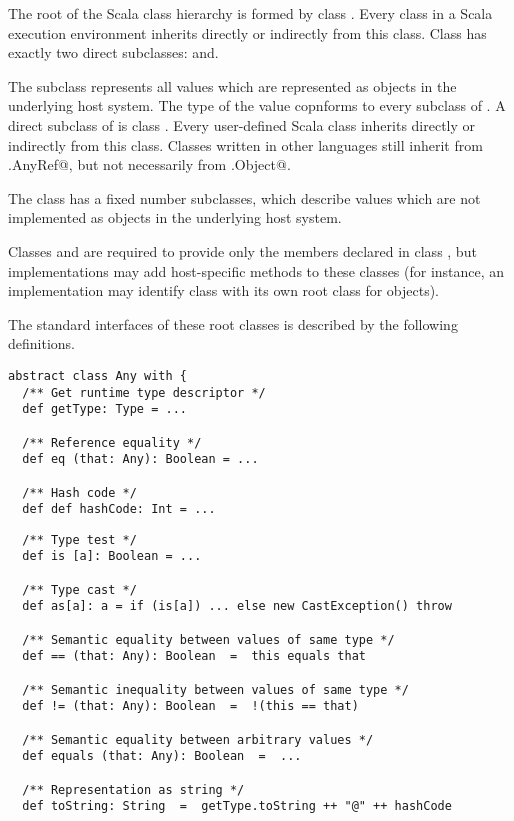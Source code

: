 \documentclass[11pt]{report}
\begin{document}
\begin{itemize}
The root of the Scala class hierarchy is formed by class \verb@Any@.
Every class in a Scala execution environment inherits directly or
indirectly from this class.  Class \verb@Any@ has exactly two direct
subclasses: \verb@AnyRef@ and\verb@AnyVal@.

The subclass \verb@AnyRef@ represents all values which are represented
as objects in the underlying host system. The type of the \verb@null@
value copnforms to every subclass of \verb@AnyRef@.  A direct subclass
of
\verb@AnyRef@ is class \verb@Object@. Every user-defined Scala
class inherits directly or indirectly from this class. Classes written
in other languages still inherit from \verb@scala.AnyRef@, but not
necessarily from \verb@scala.Object@.

The class \verb@AnyVal@ has a fixed number subclasses, which describe
values which are not implemented as objects in the underlying host
system.

Classes \verb@AnyRef@ and \verb@AnyVal@ are required to provide only
the members declared in class \verb@Any@, but implementations may add
host-specific methods to these classes (for instance, an
implementation may identify class \verb@AnyRef@ with its own root
class for objects).

The standard interfaces of these root classes is described by the
following definitions.

\begin{verbatim}
abstract class Any with {
  /** Get runtime type descriptor */
  def getType: Type = ...

  /** Reference equality */
  def eq (that: Any): Boolean = ...

  /** Hash code */
  def def hashCode: Int = ...
\end{verbatim}
\begin{verbatim}
  /** Type test */
  def is [a]: Boolean = ...

  /** Type cast */
  def as[a]: a = if (is[a]) ... else new CastException() throw

  /** Semantic equality between values of same type */
  def == (that: Any): Boolean  =  this equals that

  /** Semantic inequality between values of same type */
  def != (that: Any): Boolean  =  !(this == that)

  /** Semantic equality between arbitrary values */
  def equals (that: Any): Boolean  =  ...

  /** Representation as string */
  def toString: String  =  getType.toString ++ "@" ++ hashCode


\end{verbatim}
\end{itemize}
\end{document}
